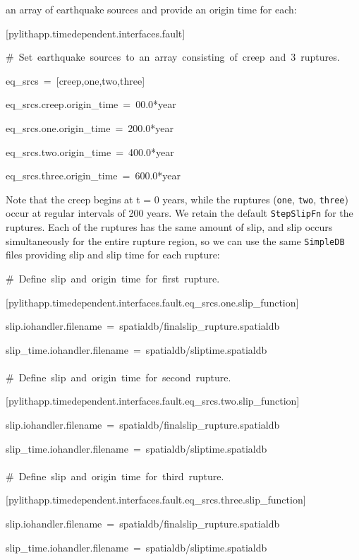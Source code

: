 an array of earthquake sources and provide an origin time for each:
\begin{lyxcode}
{[}pylithapp.timedependent.interfaces.fault{]}

\#~Set~earthquake~sources~to~an~array~consisting~of~creep~and~3~ruptures.

eq\_srcs~=~{[}creep,one,two,three{]}

eq\_srcs.creep.origin\_time~=~00.0{*}year

eq\_srcs.one.origin\_time~=~200.0{*}year

eq\_srcs.two.origin\_time~=~400.0{*}year

eq\_srcs.three.origin\_time~=~600.0{*}year
\end{lyxcode}
Note that the creep begins at t = 0 years, while the ruptures (\texttt{one},
\texttt{two}, \texttt{three}) occur at regular intervals of 200 years.
We retain the default \texttt{StepSlipFn} for the ruptures. Each of
the ruptures has the same amount of slip, and slip occurs simultaneously
for the entire rupture region, so we can use the same \texttt{SimpleDB}
files providing slip and slip time for each rupture:
\begin{lyxcode}
\#~Define~slip~and~origin~time~for~first~rupture.

{[}pylithapp.timedependent.interfaces.fault.eq\_srcs.one.slip\_function{]}

slip.iohandler.filename~=~spatialdb/finalslip\_rupture.spatialdb

slip\_time.iohandler.filename~=~spatialdb/sliptime.spatialdb~\\
~\\


\#~Define~slip~and~origin~time~for~second~rupture.

{[}pylithapp.timedependent.interfaces.fault.eq\_srcs.two.slip\_function{]}

slip.iohandler.filename~=~spatialdb/finalslip\_rupture.spatialdb

slip\_time.iohandler.filename~=~spatialdb/sliptime.spatialdb~\\
~\\


\#~Define~slip~and~origin~time~for~third~rupture.

{[}pylithapp.timedependent.interfaces.fault.eq\_srcs.three.slip\_function{]}

slip.iohandler.filename~=~spatialdb/finalslip\_rupture.spatialdb

slip\_time.iohandler.filename~=~spatialdb/sliptime.spatialdb
\end{lyxcode}
